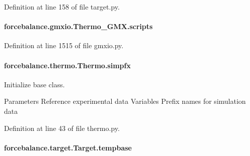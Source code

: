 Definition at line 158 of file target.\-py.

\hypertarget{classforcebalance_1_1gmxio_1_1Thermo__GMX_aade2d7eab971d8980afd20f52f5311c9}{
\paragraph[{scripts}]{\setlength{\rightskip}{0pt plus 5cm}forcebalance.\-gmxio.\-Thermo\-\_\-\-G\-M\-X.\-scripts}}\label{classforcebalance_1_1gmxio_1_1Thermo__GMX_aade2d7eab971d8980afd20f52f5311c9}


Definition at line 1515 of file gmxio.\-py.

\hypertarget{classforcebalance_1_1thermo_1_1Thermo_ab0c5f73c4c9812e2d733ffb0f65edeb9}{
\paragraph[{simpfx}]{\setlength{\rightskip}{0pt plus 5cm}forcebalance.\-thermo.\-Thermo.\-simpfx\hspace{0.3cm}{\ttfamily [inherited]}}}\label{classforcebalance_1_1thermo_1_1Thermo_ab0c5f73c4c9812e2d733ffb0f65edeb9}


Initialize base class. 

Parameters Reference experimental data Variables Prefix names for simulation data 

Definition at line 43 of file thermo.\-py.

\hypertarget{classforcebalance_1_1target_1_1Target_ae5b544d3e11365865813ef3d626ef81d}{
\paragraph[{tempbase}]{\setlength{\rightskip}{0pt plus 5cm}forcebalance.\-target.\-Target.\-tempbase\hspace{0.3cm}{\ttfamily [inherited]}}}\label{classforcebalance_1_1target_1_1Target_ae5b544d3e11365865813ef3d626ef81d}


